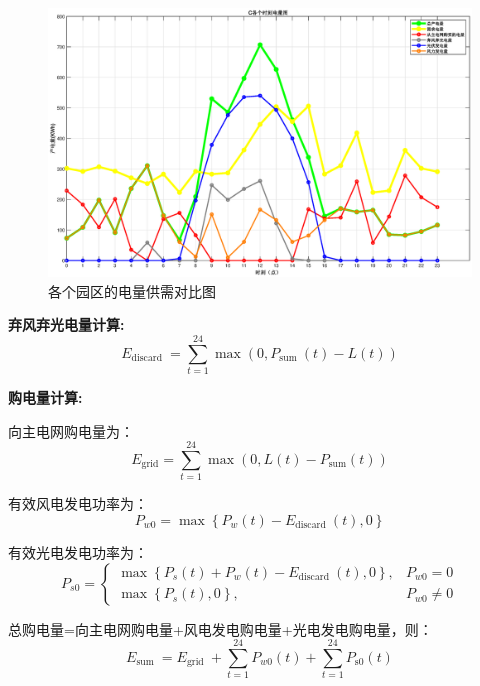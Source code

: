 \documentclass{cumcmthesis}
\begin{document}
\begin{figure}[!h]
\begin{minipage}{.5\textwidth}
\end{minipage}  
\begin{minipage}{.5\textwidth}  
  \centering  
  \includegraphics[width=.9\linewidth]{figures/C.eps}  
\end{minipage}  
\caption{各个园区的电量供需对比图}  
\end{figure} 

\newpage

\textbf{弃风弃光电量计算:}
\begin{equation}
E_{\text {discard }}=\sum_{t=1}^{24} \max \left(0, P_{\text {sum }}(t)-L(t)\right)
\end{equation}

\textbf{购电量计算:}

向主电网购电量为：
\begin{equation}
E_{\text{grid}} = \sum_{t=1}^{24} \max \left( 0, L(t) - P_{\text{sum}}(t) \right)
\end{equation}

有效风电发电功率为：
\begin{equation}
P_{w 0}=\max \left\{P_w(t)-E_{\text {discard }}(t), 0\right\}
\end{equation}

有效光电发电功率为：
\begin{equation}
P_{s 0}= \begin{cases}\max \left\{P_s(t)+P_w(t)-E_{\text {discard }}(t), 0\right\}, & P_{w 0}=0 \\ \max \left\{P_s(t), 0\right\}, & P_{w 0} \neq 0\end{cases}
\end{equation}

总购电量=向主电网购电量+风电发电购电量+光电发电购电量，则：
\begin{equation}
E_{\text {sum }}=E_{\text {grid }}+\sum_{t=1}^{24} P_{w 0}(t)+\sum_{t=1}^{24} P_{\text {s0}}(t)
\end{equation}
\end{document}
